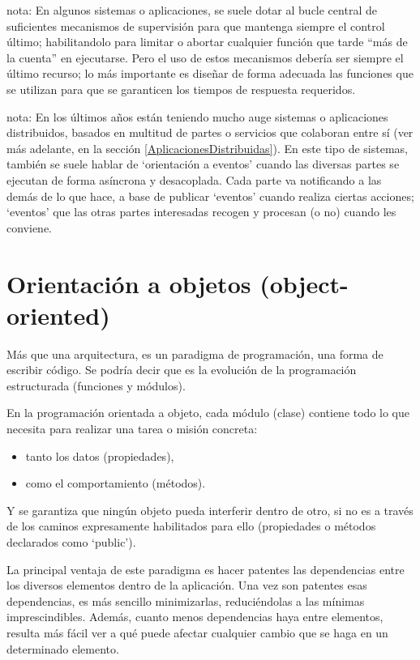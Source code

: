 \documentclass[spanish,12pt,a4paper,final,oneside]{book}
\begin{document}
nota: En algunos sistemas o aplicaciones, se suele dotar al bucle central de suficientes mecanismos de supervisión para que mantenga siempre el control último; habilitandolo para limitar o abortar cualquier función que tarde ``más de la cuenta'' en ejecutarse. Pero el uso de estos mecanismos debería ser siempre el último recurso; lo más importante es diseñar de forma adecuada las funciones que se utilizan para que se garanticen los tiempos de respuesta requeridos.

nota: En los últimos años están teniendo mucho auge sistemas o aplicaciones distribuidos, basados en multitud de partes o servicios que colaboran entre sí (ver más adelante, en la sección  \ref{AplicacionesDistribuidas}). En este tipo de sistemas, también se suele hablar de `orientación a eventos' cuando las diversas partes se ejecutan de forma asíncrona y desacoplada. Cada parte va notificando a las demás de lo que hace, a base de publicar `eventos' cuando realiza ciertas acciones; `eventos' que las otras partes interesadas recogen y procesan (o no) cuando les conviene. 

\section{Orientación a objetos (object-oriented)}\label{oop}
Más que una arquitectura, es un paradigma de programación, una forma de escribir código. Se podría decir que es la evolución de la programación estructurada (funciones y módulos). 

En la programación orientada a objeto, cada módulo (clase) contiene todo lo que necesita para realizar una tarea o misión concreta: 
\begin{itemize}
\item tanto los datos (propiedades),
\item como el comportamiento (métodos).
\end{itemize}
Y se garantiza que ningún objeto pueda interferir dentro de otro, si no es a través de los caminos expresamente habilitados para ello (propiedades o métodos declarados como ‘public’).

La principal ventaja de este paradigma es hacer patentes las dependencias entre los diversos elementos dentro de la aplicación. Una vez son patentes esas dependencias, es más sencillo minimizarlas, reduciéndolas a las mínimas imprescindibles. Además, cuanto menos dependencias haya entre elementos, resulta más fácil ver a qué puede afectar cualquier cambio que se haga en un determinado elemento.
\end{document}
